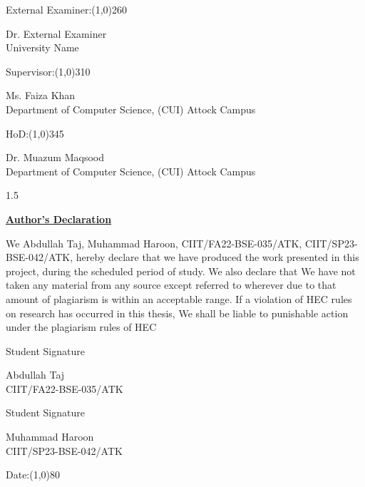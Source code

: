 \documentclass[A4paper,12pt]{report}
\theoremstyle{plain}
\theoremstyle{definition}
\theoremstyle{remark}
\numberwithin{equation}{section}
\begin{document}
\vspace{0.1in}
\noindent External Examiner:\line(1,0){260}
\begin{center}
\normalsize{Dr. External Examiner \\
University Name}\\
\end{center}
\vspace{0.1in}
Supervisor:\line(1,0){310}
\begin{center}
\normalsize{Ms. Faiza Khan\\
Department of Computer Science, (CUI) Attock Campus}
\end{center}
\vspace{0.1in}
HoD:\line(1,0){345}
\begin{center}
\normalsize{ Dr. Muazum Maqsood\\
Department of Computer Science, (CUI) Attock Campus}
\end{center}

\begin{spacing}{1.5}
\newpage
\begin{center}
\Large{\textbf{\underline {Author’s Declaration}}}\\
\end{center}

\noindent\normalsize{We Abdullah Taj, Muhammad Haroon, CIIT/FA22-BSE-035/ATK, CIIT/SP23-BSE-042/ATK, hereby
declare that we have produced the work presented in this project, during the scheduled period of study. We also declare that We have not taken any material from any source except referred to wherever due to that amount of plagiarism is within an acceptable range. If a violation of HEC rules on research has occurred in this thesis, We shall be liable to punishable action under the plagiarism rules of HEC}\\

\vspace{1in}
\begin{flushright}
Student  Signature
\vspace{0.1in}
\end{flushright}

\begin{flushright}
Abdullah Taj\\
CIIT/FA22-BSE-035/ATK
\end{flushright}

\begin{flushright}
Student Signature
\vspace{0.1in}
\end{flushright}

\begin{flushright}
Muhammad Haroon\\
CIIT/SP23-BSE-042/ATK
\end{flushright}
Date:\line(1,0){80}\hfill
\end{spacing}
\end{document}
